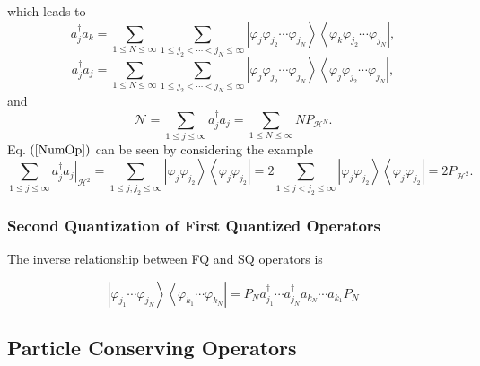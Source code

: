 \documentclass[aps,preprint]{revtex4}%
\begin{document}
which leads to
\begin{equation}
a_{j}^{\dagger}a_{k}=\sum_{1\leq N\leq\infty}\sum_{1\leq j_{2}<\cdots
<j_{N}\leq\infty}\left\vert \varphi_{j}\varphi_{j_{2}}\cdots\varphi_{j_{N}%
}\right\rangle \left\langle \varphi_{k}\varphi_{j_{2}}\cdots\varphi_{j_{N}%
}\right\vert ,
\end{equation}
\begin{equation}
a_{j}^{\dagger}a_{j}=\sum_{1\leq N\leq\infty}\sum_{1\leq j_{2}<\cdots
<j_{N}\leq\infty}\left\vert \varphi_{j}\varphi_{j_{2}}\cdots\varphi_{j_{N}%
}\right\rangle \left\langle \varphi_{j}\varphi_{j_{2}}\cdots\varphi_{j_{N}%
}\right\vert ,
\end{equation}
and
\begin{equation}
\mathcal{N=}\sum_{1\leq j\leq\infty}a_{j}^{\dagger}a_{j}=\sum_{1\leq
N\leq\infty}NP_{\mathcal{H}^{N}}. \label{NumOp}%
\end{equation}
Eq. $\left(  \ref{NumOp}\right)  $ can be seen by considering the example%
\begin{equation}
\sum_{1\leq j\leq\infty}\left.  a_{j}^{\dagger}a_{j}\right\vert _{\mathcal{H}%
^{2}}=\sum_{1\leq j,j_{2}\leq\infty}\left\vert \varphi_{j}\varphi_{j_{2}%
}\right\rangle \left\langle \varphi_{j}\varphi_{j_{2}}\right\vert
=2\sum_{1\leq j<j_{2}\leq\infty}\left\vert \varphi_{j}\varphi_{j_{2}%
}\right\rangle \left\langle \varphi_{j}\varphi_{j_{2}}\right\vert
=2P_{\mathcal{H}^{2}}.
\end{equation}


\subsubsection{Second Quantization of First Quantized Operators}

The inverse relationship between FQ and SQ operators is%

\begin{equation}
\left\vert \varphi_{j_{1}}\cdots\varphi_{j_{N}}\right\rangle \left\langle
\varphi_{k_{1}}\cdots\varphi_{k_{N}}\right\vert =P_{N}a_{j_{1}}^{\dagger
}\cdots a_{j_{N}}^{\dagger}a_{k_{N}}\cdots a_{k_{1}}P_{N}%
\end{equation}


\subsection{Particle Conserving Operators}
\end{document}
